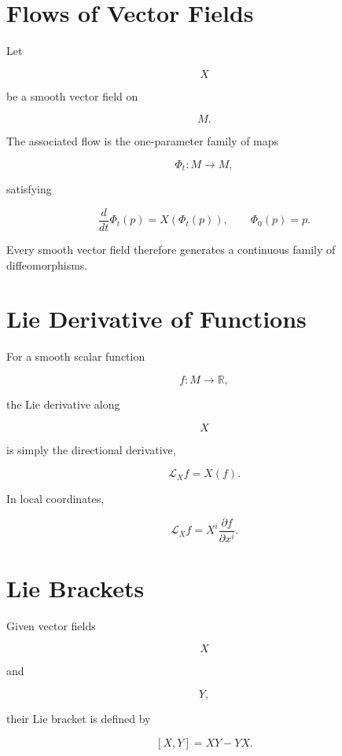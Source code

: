 \documentclass[11pt,fleqn]{book}
\numberwithin{equation}{chapter}
\theoremstyle{plain}
\theoremstyle{definition}
\theoremstyle{remark}
\begin{document}

\section{Flows of Vector Fields}

Let

\[
X
\]

be a smooth vector field on

\[
M.
\]

The associated flow is the one-parameter family of maps

\[
\Phi_t:M\rightarrow M,
\]

satisfying

\[
\frac{d}{dt}\Phi_t(p)
=
X(\Phi_t(p)),
\qquad
\Phi_0(p)=p.
\]

Every smooth vector field therefore generates a continuous family of
diffeomorphisms.


\section{Lie Derivative of Functions}

For a smooth scalar function

\[
f:M\rightarrow\mathbb R,
\]

the Lie derivative along

\[
X
\]

is simply the directional derivative,

\[
\boxed{
\mathcal L_Xf
=
X(f).
}
\]

In local coordinates,

\[
\mathcal L_Xf
=
X^i
\frac{\partial f}{\partial x^i}.
\]


\section{Lie Brackets}

Given vector fields

\[
X
\]

and

\[
Y,
\]

their Lie bracket is defined by

\[
\boxed{
[X,Y]
=
XY-YX.
}
\]
\end{document}
